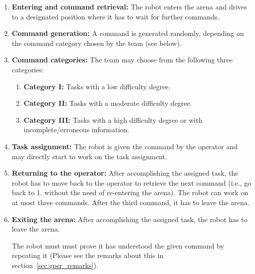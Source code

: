 \begin{enumerate}
	\item \textbf{Entering and command retrieval:} The robot enters the arena and drives to a designated position where it has to wait for further commands.

	\item \textbf{Command generation:} A command is generated randomly, depending on the command category chosen by the team (see below). \\

	\item \textbf{Command categories:} The team may choose from the following three categories:
	\begin{enumerate}
		\item \textbf{Category I:} Tasks with a low difficulty degree.
		\item \textbf{Category II:} Tasks with a moderate difficulty degree.
		\item \textbf{Category III:} Tasks with a high difficulty degree or with incomplete/erroneous information.
	\end{enumerate}

	\item \textbf{Task assignment:} The robot is given the command by the operator and may directly start to work on the task assignment.

	\item \textbf{Returning to the operator:} After accomplishing the assigned task, the robot has to move back to the operator to retrieve the next command (i.e., go back to 1. without the need of re-entering the arena). The robot can work on at most three commands. After the third command, it has to leave the arena.

	\item \textbf{Exiting the arena:} After accomplishing the assigned task, the robot has to leave the arena.

	The robot must must prove it has understood the given command by repeating it (Please see the remarks about this in section~\ref{sec:gpsr_remarks}).
\end{enumerate}

